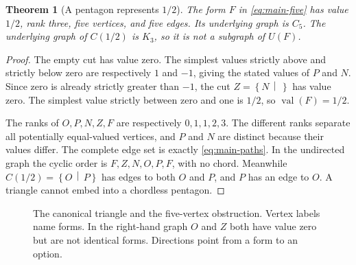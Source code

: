\documentclass[11pt,a4paper]{article}
\numberwithin{equation}{section}
\newtheorem{theorem}{Theorem}[section]
\theoremstyle{definition}
\theoremstyle{remark}
\newcommand{\val}{\operatorname{val}}
\newcommand{\cut}[2]{\left\{#1\,\middle|\,#2\right\}}
\newcommand{\can}{C}
\begin{document}
\begin{theorem}[A pentagon represents $1/2$]
\label{thm:pentagon}
The form $F$ in \eqref{eq:main-five} has value $1/2$, rank three, five vertices,
and five edges. Its underlying graph is $C_5$. The underlying graph of
$\can(1/2)$ is $K_3$, so it is not a subgraph of $U(F)$.
\end{theorem}

\begin{proof}
The empty cut has value zero. The simplest values strictly above and strictly
below zero are respectively $1$ and $-1$, giving the stated values of $P$ and
$N$. Since zero is already strictly greater than $-1$, the cut $Z=\cut{N}{}$
has value zero. The simplest value strictly between zero and one is $1/2$, so
$\val(F)=1/2$.

The ranks of $O,P,N,Z,F$ are respectively $0,1,1,2,3$. The different ranks
separate all potentially equal-valued vertices, and $P$ and $N$ are distinct
because their values differ. The complete edge set is exactly
\eqref{eq:main-paths}. In the undirected graph the cyclic order is
$F,Z,N,O,P,F$, with no chord. Meanwhile $\can(1/2)=\cut{O}{P}$ has edges to
both $O$ and $P$, and $P$ has an edge to $O$. A triangle cannot embed into a
chordless pentagon.
\end{proof}

\begin{figure}[htbp]
\centering
{}
\caption{The canonical triangle and the five-vertex obstruction. Vertex labels
name forms. In the right-hand graph $O$ and $Z$ both have value zero but are not
identical forms. Directions point from a form to an option.}
\label{fig:pentagon}
\end{figure}
\end{document}
